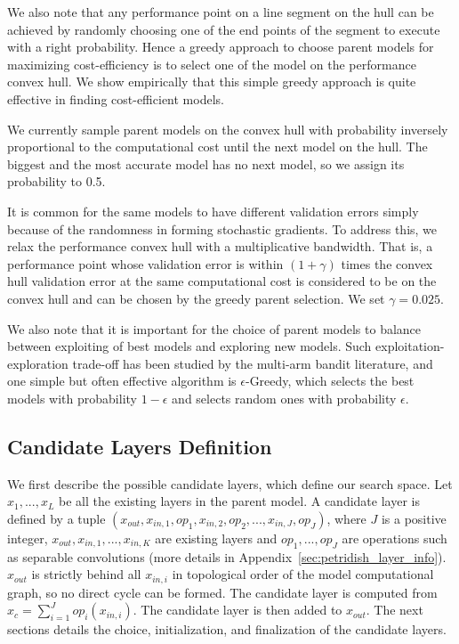 \documentclass{article}
\begin{document}
We also note that any performance point on a line segment on the hull can be achieved by randomly choosing one of the end points of the segment to execute with a right probability. Hence a greedy approach to choose parent models for maximizing cost-efficiency is to select one of the model on the performance convex hull. We show empirically that this simple greedy approach is quite effective in finding cost-efficient models. 

We currently sample parent models on the convex hull with probability inversely proportional to the computational cost until the next model on the hull. The biggest and the most accurate model has no next model, so we assign its probability to 0.5.

It is common for the same models to have different validation errors simply because of the randomness in forming stochastic gradients. To address this, we relax the performance convex hull with a multiplicative bandwidth. That is, a performance point whose validation error is within $(1 + \gamma)$ times the convex hull validation error at the same computational cost is considered to be on the convex hull and can be chosen by the greedy parent selection. We set $\gamma = 0.025$. 

We also note that it is important for the choice of parent models to balance between exploiting of best models and exploring new models. Such exploitation-exploration trade-off has been studied by the multi-arm bandit literature, and one simple but often effective algorithm is $\epsilon$-Greedy, which selects the best models with probability $1-\epsilon$ and selects random ones with probability $\epsilon$. 


\subsection{Candidate Layers Definition}
\label{sec:hallu_choice}

We first describe the possible candidate layers, which define our search space. 
Let $x_1,...,x_L$ be all the existing layers in the parent model. A candidate layer 
is defined by a tuple $(x_{out}, x_{in, 1}, op_1, x_{in, 2}, op_2, ..., x_{in, J}, op_J)$, where $J$ is a positive integer, $x_{out}, x_{in, 1},..., x_{in,K}$ are existing layers and $op_1, ..., op_J$ are operations such as separable convolutions (more details in Appendix~\ref{sec:petridish_layer_info}). $x_{out}$ is strictly behind all $x_{in,i}$ in topological order of the model computational graph, so no direct cycle can be formed. The candidate layer is computed from $x_c = \sum _{i=1}^J op_i(x_{in,i})$. The candidate layer is then added to $x_{out}$.
The next sections details the choice, initialization, and finalization of the candidate layers. 
\end{document}
